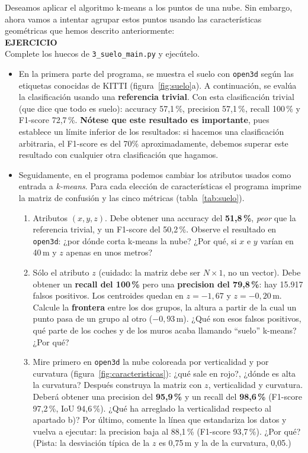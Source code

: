 \documentclass{article}
\begin{document}
\begin{exercise}\label{ej:suelo}
Deseamos aplicar el algoritmo k-means a los puntos de una nube. Sin embargo, ahora vamos a intentar agrupar estos puntos usando las características geométricas que hemos descrito anteriormente:\\
\textbf{EJERCICIO}\\
Complete los huecos de \texttt{3\_suelo\_main.py} y ejecútelo. 
\begin{itemize}
\item En la primera parte del programa, se muestra el suelo con \texttt{open3d} según las etiquetas conocidas de KITTI (figura~\ref{fig:suelo}a). A continuación, se evalúa la clasificación usando una \textbf{referencia trivial}. Con esta clasificación trivial (que dice que todo es suelo): accuracy 57{,}1\,\%, precision 57{,}1\,\%, recall 100\,\% y F1-score 72{,}7\,\%. \textbf{Nótese que este resultado es importante}, pues establece un límite inferior de los resultados: si hacemos una clasificación arbitraria, el F1-score es del 70\% aproximadamente, debemos superar este resultado con cualquier otra clasificación que hagamos.
\item Seguidamente, en el programa podemos cambiar los atributos usados como entrada a \textit{k-means}. Para cada elección de características el programa imprime la matriz de confusión y las cinco métricas (tabla~\ref{tab:suelo}).
\begin{enumerate}
    \item[a)] Atributos $(x, y, z)$. Debe obtener una accuracy del \textbf{51{,}8\,\%}, \emph{peor} que la referencia trivial, y un F1-score del 50{,}2\,\%. Observe el resultado en \texttt{open3d}: ¿por dónde corta k-means la nube? ¿Por qué, si $x$ e $y$ varían en 40\,m y $z$ apenas en unos metros?
    \item[b)] Sólo el atributo $z$ (cuidado: la matriz debe ser $N \times 1$, no un vector). Debe obtener un \textbf{recall del 100\,\%} pero una \textbf{precision del 79{,}8\,\%}: hay 15.917 falsos positivos. Los centroides quedan en $z = -1{,}67$ y $z = -0{,}20$\,m. Calcule la \textbf{frontera} entre los dos grupos, la altura a partir de la cual un punto pasa de un grupo al otro ($-0{,}93$\,m). ¿Qué son esos falsos positivos, qué parte de los coches y de los muros acaba llamando ``suelo'' k-means? ¿Por qué?
    \item[c)] Mire primero en \texttt{open3d} la nube coloreada por verticalidad y por curvatura (figura~\ref{fig:caracteristicas}): ¿qué sale en rojo?, ¿dónde es alta la curvatura? Después construya la matriz con $z$, verticalidad y curvatura. Deberá obtener una precision del \textbf{95{,}9\,\%} y un recall del \textbf{98{,}6\,\%} (F1-score 97{,}2\,\%, IoU 94{,}6\,\%). ¿Qué ha arreglado la verticalidad respecto al apartado b)? Por último, comente la línea que estandariza los datos y vuelva a ejecutar: la precision baja al 88{,}1\,\% (F1-score 93{,}7\,\%). ¿Por qué? (Pista: la desviación típica de la $z$ es 0{,}75\,m y la de la curvatura, 0{,}05.)

\end{enumerate}
\end{itemize}
\end{exercise}
\end{document}
